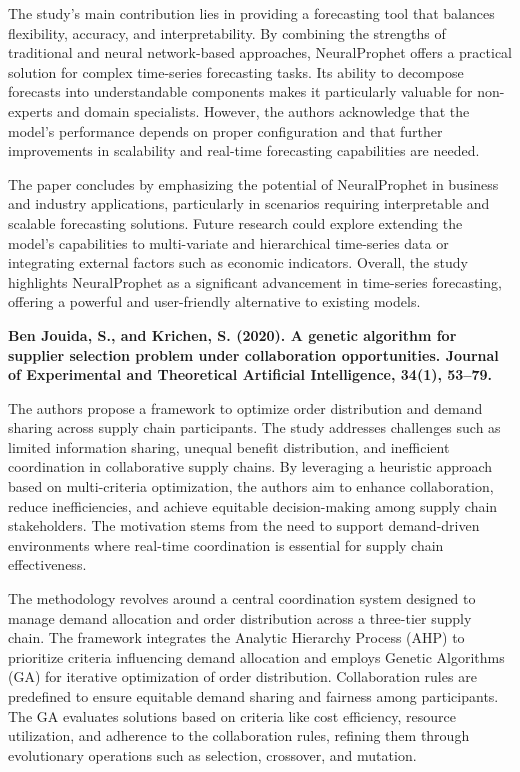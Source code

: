 The study’s main contribution lies in providing a forecasting tool that balances flexibility, accuracy, and interpretability. By combining the strengths of traditional and neural network-based approaches, NeuralProphet offers a practical solution for complex time-series forecasting tasks. Its ability to decompose forecasts into understandable components makes it particularly valuable for non-experts and domain specialists. However, the authors acknowledge that the model’s performance depends on proper configuration and that further improvements in scalability and real-time forecasting capabilities are needed.

The paper concludes by emphasizing the potential of NeuralProphet in business and industry applications, particularly in scenarios requiring interpretable and scalable forecasting solutions. Future research could explore extending the model’s capabilities to multi-variate and hierarchical time-series data or integrating external factors such as economic indicators. Overall, the study highlights NeuralProphet as a significant advancement in time-series forecasting, offering a powerful and user-friendly alternative to existing models.

\textbf{\cite{siham2022genetic} Ben Jouida, S., and Krichen, S. (2020). A genetic algorithm for supplier selection problem under collaboration opportunities. Journal of Experimental and Theoretical Artificial Intelligence, 34(1), 53–79.}

The authors propose a framework to optimize order distribution and demand sharing across supply chain participants. The study addresses challenges such as limited information sharing, unequal benefit distribution, and inefficient coordination in collaborative supply chains. By leveraging a heuristic approach based on multi-criteria optimization, the authors aim to enhance collaboration, reduce inefficiencies, and achieve equitable decision-making among supply chain stakeholders. The motivation stems from the need to support demand-driven environments where real-time coordination is essential for supply chain effectiveness.

The methodology revolves around a central coordination system designed to manage demand allocation and order distribution across a three-tier supply chain. The framework integrates the Analytic Hierarchy Process (AHP) to prioritize criteria influencing demand allocation and employs Genetic Algorithms (GA) for iterative optimization of order distribution. Collaboration rules are predefined to ensure equitable demand sharing and fairness among participants. The GA evaluates solutions based on criteria like cost efficiency, resource utilization, and adherence to the collaboration rules, refining them through evolutionary operations such as selection, crossover, and mutation.

